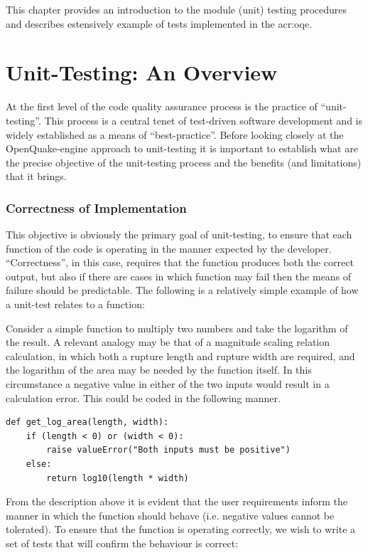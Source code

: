 This chapter provides an introduction to the module (unit) testing 
procedures \parencite{myers2012} and describes estensively example 
of tests implemented in the \gls{acr:oqe}.

\section{Unit-Testing: An Overview}
%
At the first level of the code quality assurance process is 
the practice of ``unit-testing''. This process is a central tenet 
of test-driven software development and is widely established as a 
means of ``best-practice''. 
%
Before looking closely at the OpenQuake-engine
approach to unit-testing it is important to establish what are the 
precise objective of the unit-testing process and the benefits (and 
limitations) that it brings.

\subsubsection{Correctness of Implementation}

This objective is obviously the primary goal of unit-testing, to 
ensure that each function of the code is operating in the manner 
expected by the developer. ``Correctness'', in this case, requires 
that the function produces both the correct output, but also if 
there are cases in which function may fail then the means of failure 
should be predictable. The following is a relatively simple example 
of how a unit-test relates to a function:

Consider a simple function to multiply two numbers and take the 
logarithm of the result. A relevant analogy may be that of a 
magnitude scaling relation calculation, in which both a rupture 
length and rupture width are required, and the logarithm of the 
area may be needed by the function itself. In this circumstance 
a negative value in either of the two inputs would result in a 
calculation error. This could be coded in the following manner. 

\begin{lstlisting}[frame=single]
def get_log_area(length, width):
    if (length < 0) or (width < 0):
        raise valueError("Both inputs must be positive")
    else:
        return log10(length * width)
\end{lstlisting}

From the description above it is evident that the user requirements  
inform the manner in which the function should behave (i.e. negative
values cannot be tolerated). To ensure that the function is operating
correctly, we wish to write a set of tests that will confirm the 
behaviour is correct:

